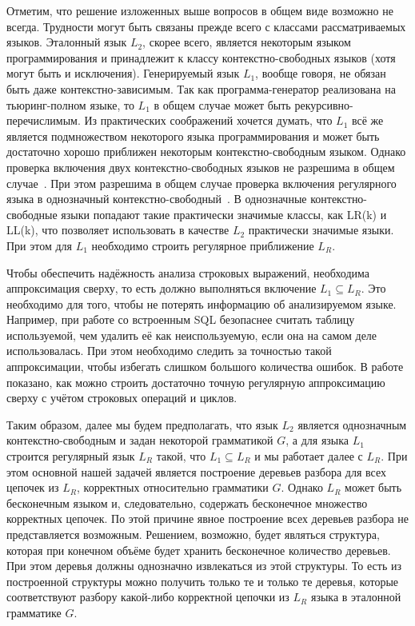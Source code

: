 Отметим, что решение изложенных выше вопросов в общем виде возможно не всегда. Трудности могут быть связаны прежде всего с классами рассматриваемых языков. Эталонный язык $L_2$, скорее всего, является некоторым языком программирования и принадлежит к классу контекстно-свободных языков (хотя могут быть и исключения). Генерируемый язык $L_1$, вообще говоря, не обязан быть даже контекстно-зависимым. Так как программа-генератор реализована на тьюринг-полном языке, то $L_1$ в общем случае может быть рекурсивно-перечислимым. Из практических соображений хочется думать, что $L_1$ всё же является подмножеством некоторого языка программирования и может быть достаточно хорошо приближен некоторым контекстно-свободным языком. Однако проверка включения двух контекстно-свободных языков не разрешима в общем случае~\cite{LangIncusion}. При этом разрешима в общем случае проверка включения регулярного языка в однозначный контекстно-свободный~\cite{LangIncusion}. В однозначные контекстно-свободные языки попадают такие практически значимые классы, как LR(k) и LL(k), что позволяет использовать в качестве $L_2$ практически значимые языки. При этом для $L_1$ необходимо строить регулярное приближение $L_R$.

Чтобы обеспечить надёжность анализа строковых выражений, необходима аппроксимация сверху, то есть должно выполняться включение $L_1 \subseteq L_R$. Это необходимо для того, чтобы не потерять информацию об анализируемом языке. Например, при работе со встроенным SQL безопаснее считать таблицу используемой, чем удалить её как неиспользуемую, если она на самом деле использовалась. При этом необходимо следить за точностью такой аппроксимации, чтобы избегать слишком большого количества ошибок. В работе~\cite{RegOverApprox} показано, как можно строить достаточно точную регулярную аппроксимацию сверху с учётом строковых операций и циклов.

Таким образом, далее мы будем предполагать, что язык $L_2$ является однозначным контекстно-свободным и задан некоторой грамматикой $G$, а для языка $L_1$ строится регулярный язык $L_R$ такой, что $L_1 \subseteq L_R$ и мы работает далее с $L_R$. При этом основной нашей задачей является построение деревьев разбора для всех цепочек из $L_R$, корректных относительно грамматики $G$. Однако $L_R$ может быть бесконечным языком и, следовательно, содержать бесконечное множество корректных цепочек. По этой причине явное построение всех деревьев разбора не представляется возможным. Решением, возможно, будет являться структура, которая при конечном объёме будет хранить бесконечное количество деревьев. При этом деревья должны однозначно извлекаться из этой структуры. То есть из построенной структуры можно получить только те и только те деревья, которые соответствуют разбору какой-либо корректной цепочки из $L_R$ языка в эталонной грамматике $G$.


